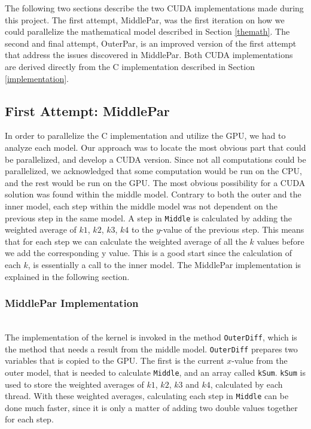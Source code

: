 The following two sections describe the two CUDA implementations made during this project. The first attempt, MiddlePar, was the first iteration on how we could parallelize the mathematical model described in Section \ref{themath}. The second and final attempt, OuterPar, is an improved version of the first attempt that address the issues discovered in MiddlePar. Both CUDA implementations are derived directly from the C implementation described in Section \ref{implementation}.

\subsection{First Attempt: MiddlePar}
\label{sec:firstattempt}
In order to parallelize the C implementation and utilize the GPU, we had to analyze each model. Our approach was to locate the most obvious part that could be parallelized, and develop a CUDA version. Since not all computations could be parallelized, we acknowledged that some computation would be run on the CPU, and the rest would be run on the GPU. The most obvious possibility for a CUDA solution was found within the middle model. Contrary to both the outer and the inner model, each step within the middle model was not dependent on the previous step in the same model. A step in \texttt{Middle} is calculated by adding the weighted average of $k1$, $k2$, $k3$, $k4$ to the $y$-value of the previous step. This means that for each step we can calculate the weighted average of all the $k$ values before we add the corresponding y value. This is a good start since the calculation of each $k$, is essentially a call to the inner model. The MiddlePar implementation is explained in the following section.

\subsubsection{MiddlePar Implementation} \hfill\\
The implementation of the kernel is invoked in the method \texttt{OuterDiff}, which is the method that needs a result from the middle model. \texttt{OuterDiff} prepares two variables that is copied to the GPU. The first is the current $x$-value from the outer model, that is needed to calculate \texttt{Middle}, and an array called \texttt{kSum}. \texttt{kSum} is used to store the weighted averages of $k1$, $k2$, $k3$ and $k4$, calculated by each thread. With these weighted averages, calculating each step in \texttt{Middle} can be done much faster, since it is only a matter of adding two double values together for each step. \\ \\

